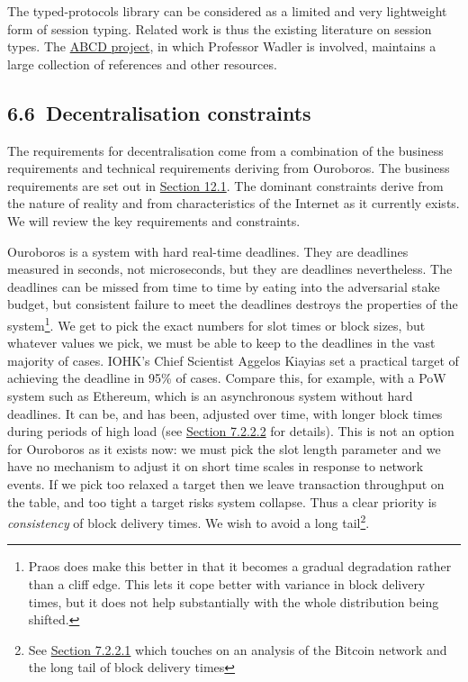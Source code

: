 \documentclass[]{article}
\begin{document}
The typed-protocols library can be considered as a limited and very
lightweight form of session typing. Related work is thus the existing
literature on session types. The
\href{https://groups.inf.ed.ac.uk/abcd/}{{ABCD project}}, in which
Professor Wadler is involved, maintains a large collection of references
and other resources.

\hypertarget{decentralisation-constraints}{%
\subsection{​6.6​~Decentralisation
constraints}\label{decentralisation-constraints}}

The requirements for decentralisation come from a combination of the
business requirements and technical requirements deriving from
Ouroboros. The business requirements are set out in
\protect\hyperlink{business-requirements}{{Section 12.1}}. The dominant
constraints derive from the nature of reality and from characteristics
of the Internet as it currently exists. We will review the key
requirements and constraints.

Ouroboros is a system with hard real-time deadlines. They are deadlines
measured in seconds, not microseconds, but they are deadlines
nevertheless. The deadlines can be missed from time to time by eating
into the adversarial stake budget, but consistent failure to meet the
deadlines destroys the properties of the system\footnote{Praos does make
  this better in that it becomes a gradual degradation rather than a
  cliff edge. This lets it cope better with variance in block delivery
  times, but it does not help substantially with the whole distribution
  being shifted.}. We get to pick the exact numbers for slot times or
block sizes, but whatever values we pick, we must be able to keep to the
deadlines in the vast majority of cases. IOHK's Chief Scientist Aggelos
Kiayias set a practical target of achieving the deadline in 95\% of
cases. Compare this, for example, with a PoW system such as Ethereum,
which is an asynchronous system without hard deadlines. It can be, and
has been, adjusted over time, with longer block times during periods of
high load (see \protect\hyperlink{ethereum}{{Section 7.2.2.2}} for
details). This is not an option for Ouroboros as it exists now: we must
pick the slot length parameter and we have no mechanism to adjust it on
short time scales in response to network events. If we pick too relaxed
a target then we leave transaction throughput on the table, and too
tight a target risks system collapse. Thus a clear priority is
\emph{consistency} of block delivery times. We wish to avoid a long
tail\footnote{See \protect\hyperlink{bitcoin}{{Section 7.2.2.1}} which
  touches on an analysis of the Bitcoin network and the long tail of
  block delivery times}.
\end{document}
